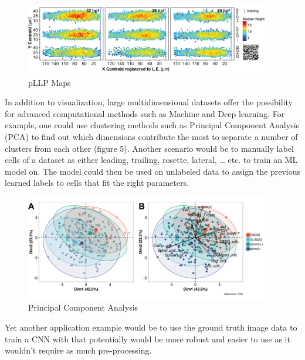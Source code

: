 \documentclass[11pt,singlespacinge,twoside]{reedthesis} %
\begin{document}
\begin{figure}

{\centering \includegraphics[width=0.95\textwidth]{figures/summary/methodology_mapr} 

}

\caption[pLLP Maps]{pLLP Maps}\label{fig:dismap}
\end{figure}
In addition to visualization, large multidimensional datasets offer the possibility for advanced computational methods such as Machine and Deep learning. For example, one could use clustering methods such as Principal Component Analysis (PCA) to find out which dimensions contribute the most to separate a number of clusters from each other (figure 5). Another scenario would be to manually label cells of a dataset as either leading, trailing, rosette, lateral, \ldots{} etc. to train an ML model on. The model could then be used on unlabeled data to assign the previous learned labels to cells that fit the right parameters.


\begin{figure}

{\centering \includegraphics[width=0.95\textwidth]{figures/summary/pca_fig} 

}

\caption[Principal Component Analysis]{Principal Component Analysis}\label{fig:dispca}
\end{figure}
Yet another application example would be to use the ground truth image data to train a CNN with that potentially would be more robust and easier to use as it wouldn't require as much pre-processing.
\end{document}
